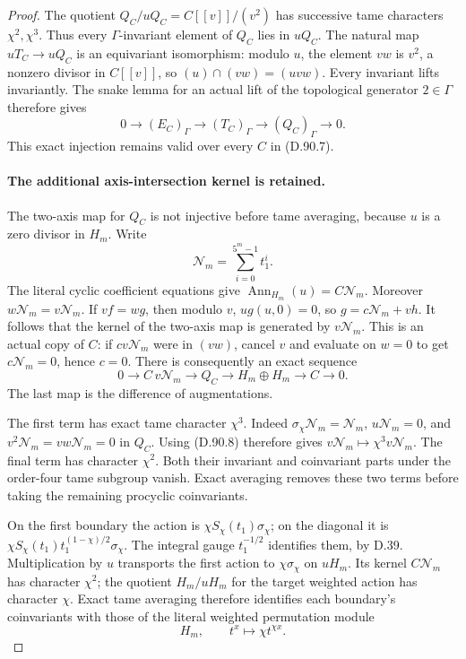 \begin{proof}
The quotient \(Q_C/uQ_C=C[[v]]/(v^2)\) has successive
tame characters \(\chi^2,\chi^3\). Thus every
\(\Gamma\)-invariant element of \(Q_C\) lies in \(uQ_C\).
The natural map \(uT_C\to uQ_C\) is an equivariant
isomorphism: modulo \(u\), the element \(vw\) is
\(v^2\), a nonzero divisor in \(C[[v]]\), so
\((u)\cap(vw)=(uvw)\). Every invariant lifts invariantly.
The snake lemma for an actual lift of the topological
generator \(2\in\Gamma\) therefore gives
\[
 0\longrightarrow(E_C)_\Gamma\longrightarrow(T_C)_\Gamma
                  \longrightarrow(Q_C)_\Gamma\longrightarrow0.
                                                               \tag{D.90.11}
\]
This exact injection remains valid over every \(C\) in (D.90.7).

\paragraph{The additional axis-intersection kernel is retained.}
The two-axis map for \(Q_C\) is not injective before tame
averaging, because \(u\) is a zero divisor in \(H_m\).
Write
\[
                    \mathcal N_m=\sum_{i=0}^{5^m-1}t_1^i.
\]
The literal cyclic coefficient equations give
\(\operatorname{Ann}_{H_m}(u)=C\mathcal N_m\).
Moreover \(w\mathcal N_m=v\mathcal N_m\).
If \(vf=wg\), then modulo \(v\),
\(u g(u,0)=0\), so \(g=c\mathcal N_m+vh\).
It follows that the kernel of the two-axis map is
generated by \(v\mathcal N_m\). This is an actual copy
of \(C\): if \(c v\mathcal N_m\) were in \((vw)\),
cancel \(v\) and evaluate on \(w=0\) to get
\(c\mathcal N_m=0\), hence \(c=0\).
There is consequently an exact sequence
\[
 0\longrightarrow C\,v\mathcal N_m\longrightarrow Q_C
 \longrightarrow H_m\oplus H_m\longrightarrow C\longrightarrow0.
                                                               \tag{D.90.12}
\]
The last map is the difference of augmentations.

The first term has exact tame character \(\chi^3\).
Indeed \(\sigma_\chi\mathcal N_m=\mathcal N_m\),
\(u\mathcal N_m=0\), and
\(v^2\mathcal N_m=vw\mathcal N_m=0\) in \(Q_C\).
Using (D.90.8) therefore gives
\(v\mathcal N_m\mapsto\chi^3 v\mathcal N_m\).
The final term has character \(\chi^2\). Both their
invariant and coinvariant parts under the order-four tame
subgroup vanish. Exact averaging removes these two terms
before taking the remaining procyclic coinvariants.

On the first boundary the action is
\(\chi S_\chi(t_1)\sigma_\chi\); on the diagonal it is
\(\chi S_\chi(t_1)t_1^{(1-\chi)/2}\sigma_\chi\).
The integral gauge \(t_1^{-1/2}\) identifies them, by D.39.
Multiplication by \(u\) transports the first action to
\(\chi\sigma_\chi\) on \(uH_m\).
Its kernel \(C\mathcal N_m\) has character \(\chi^2\);
the quotient \(H_m/uH_m\) for the target weighted action
has character \(\chi\). Exact tame averaging therefore
identifies each boundary's coinvariants with those of the
literal weighted permutation module
\[
                H_m,\qquad t^x\longmapsto\chi t^{\chi x}.
                                                               \tag{D.90.13}
\]


\end{proof}
